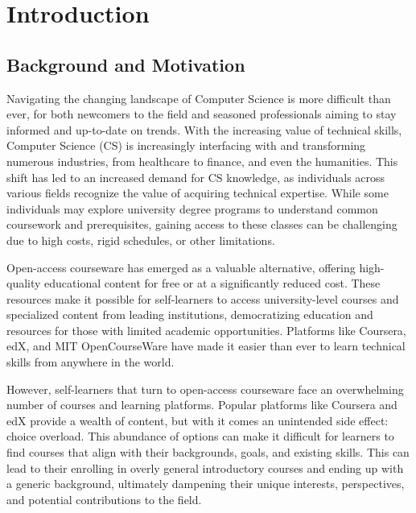 \chapter{Introduction} \label{chap:chap-1}




\section{Background and Motivation}

Navigating the changing landscape of Computer Science is more difficult than ever, for both newcomers to the field and seasoned professionals aiming to stay informed and up-to-date on trends. With the increasing value of technical skills, Computer Science (CS) is increasingly interfacing with and transforming numerous industries, from healthcare to finance, and even the humanities. This shift has led to an increased demand for CS knowledge, as individuals across various fields recognize the value of acquiring technical expertise. While some individuals may explore university degree programs to understand common coursework and prerequisites, gaining access to these classes can be challenging due to high costs, rigid schedules, or other limitations.

Open-access courseware has emerged as a valuable alternative, offering high-quality educational content for free or at a significantly reduced cost. These resources make it possible for self-learners to access university-level courses and specialized content from leading institutions, democratizing education and resources for those with limited academic opportunities. Platforms like Coursera, edX, and MIT OpenCourseWare have made it easier than ever to learn technical skills from anywhere in the world.

However, self-learners that turn to open-access courseware face an overwhelming number of courses and learning platforms. Popular platforms like Coursera and edX provide a wealth of content, but with it comes an unintended side effect: choice overload. This abundance of options can make it difficult for learners to find courses that align with their backgrounds, goals, and existing skills. This can lead to their enrolling in overly general introductory courses and ending up with a generic background, ultimately dampening their unique interests, perspectives, and potential contributions to the field.

